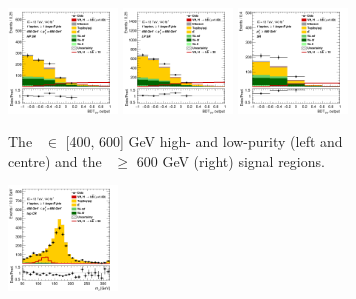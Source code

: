 \begin{figure}[h!]
    \centering
    \begin{subfigure}[b]{\textwidth}
        \centering
        \includegraphics[width=0.32\textwidth]{Images/VH/Own_fit/prefit_VHbb/Region_distmva_BMax600_BMin400_incFat1_Fat1_DSRnoaddbjetsr_J0_TTypebb_T2_L1_Y6051_Prefit.png}
        \includegraphics[width=0.32\textwidth]{Images/VH/Own_fit/prefit_VHbb/Region_distmva_BMax600_BMin400_incFat1_Fat1_DSRnoaddbjetsr_J1_TTypebb_incJet1_T2_L1_Y6051_Prefit.png}
        \includegraphics[width=0.32\textwidth]{Images/VH/Own_fit/prefit_VHbb/Region_distmva_BMin600_incFat1_Fat1_DSRnoaddbjetsr_J0_TTypebb_incJet1_T2_L1_Y6051_Prefit.png}
        \caption{The \ptv\ $\in$ [400, 600] GeV high- and low-purity (left and centre) and the \ptv\ $\geq$ 600 GeV (right) signal regions.}
        \label{fig:plots_VHbbBoost_1L_SR}
    \end{subfigure}
    \begin{subfigure}[b]{\textwidth}
        \centering
        \includegraphics[width=0.32\textwidth]{Images/VH/Own_fit/prefit_VHbb/Region_distmBB_BMax600_BMin400_incFat1_Fat1_DSRtopaddbjetcr_J0_TTypebb_incJet1_T2_L1_Y6051_Prefit.png}

\end{subfigure}
\end{figure}
